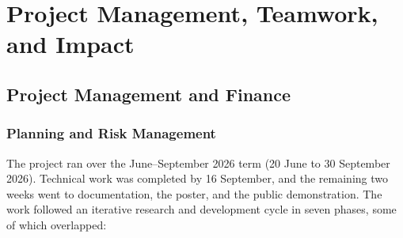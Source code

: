 \chapter{Project Management, Teamwork, and Impact}
\label{ch:management}

\section{Project Management and Finance}

\subsection{Planning and Risk Management}
\label{sec:plan}

The project ran over the June--September 2026 term (20 June to 30 September 2026). Technical work was completed by 16 September, and the remaining two weeks went to documentation, the poster, and the public demonstration. The work followed an iterative research and development cycle in seven phases, some of which overlapped:
